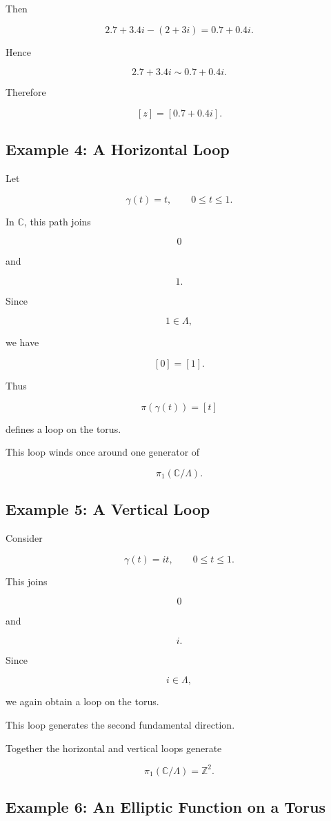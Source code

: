 \documentclass[12pt,a4paper]{article}
\theoremstyle{notespace}
\begin{document}
Then

\[
2.7+3.4i-(2+3i)
=
0.7+0.4i.
\]

Hence

\[
2.7+3.4i
\sim
0.7+0.4i.
\]

Therefore

\[
[z]
=
[0.7+0.4i].
\]

\subsection{Example 4: A Horizontal Loop}

Let

\[
\gamma(t)=t,
\qquad
0\le t\le1.
\]

In \(\mathbb C\), this path joins

\[
0
\]

and

\[
1.
\]

Since

\[
1\in\Lambda,
\]

we have

\[
[0]=[1].
\]

Thus

\[
\pi(\gamma(t))
=
[t]
\]

defines a loop on the torus.

This loop winds once around one generator of

\[
\pi_1(\mathbb C/\Lambda).
\]

\subsection{Example 5: A Vertical Loop}

Consider

\[
\gamma(t)=it,
\qquad
0\le t\le1.
\]

This joins

\[
0
\]

and

\[
i.
\]

Since

\[
i\in\Lambda,
\]

we again obtain a loop on the torus.

This loop generates the second fundamental direction.

Together the horizontal and vertical loops generate

\[
\pi_1(\mathbb C/\Lambda)
=
\mathbb Z^2.
\]

\subsection{Example 6: An Elliptic Function on a Torus}
\end{document}
